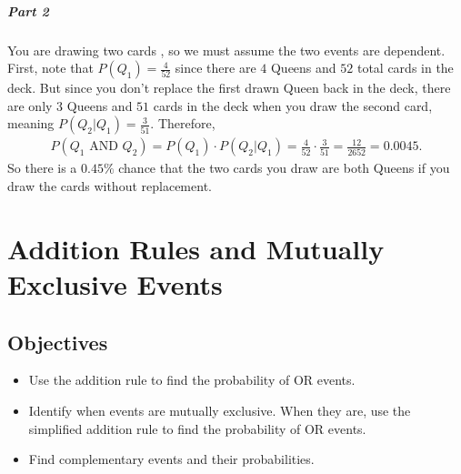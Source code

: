 \documentclass[letterpaper,10pt,english]{jupyterBook}
\begin{document}
\subparagraph{Part 2}
\label{\detokenize{Ch3 Probability/3.3 Multiplication Rules and Independent Events:id8}}
\sphinxAtStartPar
You are drawing two cards , so we must assume the two events are dependent. First, note that \(P(Q_1) = \frac{4}{52}\) since there are \(4\) Queens and \(52\) total cards in the deck. But since you don’t replace the first drawn Queen back in the deck, there are only \(3\) Queens and \(51\) cards in the deck when you draw the second card, meaning \(P(Q_2|Q_1) = \frac{3}{51}\). Therefore,
\begin{equation*}
\begin{split} P(Q_1 \text{ AND } Q_2) = P(Q_1) \cdot P(Q_2|Q_1) = \frac{4}{52} \cdot \frac{3}{51} = \frac{12}{2652} = 0.0045.\end{split}
\end{equation*}
\sphinxAtStartPar
So there is a \(0.45\%\) chance that the two cards you draw are both Queens if you draw the cards without replacement.

\sphinxstepscope


\section{Addition Rules and Mutually Exclusive Events}
\label{\detokenize{Ch3 Probability/3.4 Addition Rules and Mutually Exclusive Events:addition-rules-and-mutually-exclusive-events}}\label{\detokenize{Ch3 Probability/3.4 Addition Rules and Mutually Exclusive Events::doc}}

\subsection{Objectives}
\label{\detokenize{Ch3 Probability/3.4 Addition Rules and Mutually Exclusive Events:objectives}}\begin{itemize}
\item {} 
\sphinxAtStartPar
Use the addition rule to find the probability of \(\text{OR}\) events.

\item {} 
\sphinxAtStartPar
Identify when events are mutually exclusive. When they are, use the simplified addition rule to find the probability of \(\text{OR}\) events.

\item {} 
\sphinxAtStartPar
Find complementary events and their probabilities.

\end{itemize}
\end{document}

